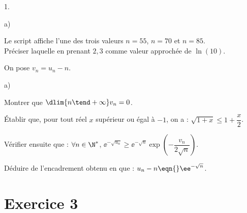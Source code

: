 \begin{noliste}{1.}
\begin{noliste}{a)}


    

  \item Le script affiche l'une des trois valeurs $n = 55$, $n = 70$
    et $n = 85$. \\
    Préciser laquelle en prenant $2,3$ comme valeur approchée de
    $\ln(10)$.

        
  \end{noliste}




\item On pose $v_n = u_n-n$.
  \begin{noliste}{a)}
    \setlength{\itemsep}{2mm}
  \item Montrer que $\dlim{n \tend +\infty} v_n= 0$.

    

  \item Établir que, pour tout réel $x$ supérieur ou égal à $-1$, on a
    : $\sqrt{1 + x} \leq 1 + \dfrac{x}{2}$.

    




  \item Vérifier ensuite que : $\forall n \in \N^{*}$,
    $\ee^{-\sqrt{u_n}} \geq \ee^{-\sqrt{n}} \exp\left(
      -\dfrac{v_n}{2\sqrt{n}} \right)$.

    




  \item Déduire de l'encadrement obtenu en  que : $u_n - n
    \eqn{} \ee^{-\sqrt{n}}$.

    
  \end{noliste}
\end{noliste}

\section*{Exercice 3}


